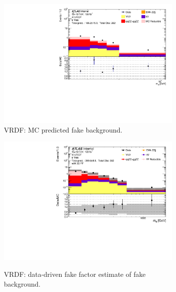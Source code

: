 \begin{figure}[htb]
    \centering
    \begin{subfigure}{.48\textwidth}
        \centering
        \includegraphics[width = 0.9\linewidth]{figures/Analysis/Background/Overlay_VRDF_MC_M4l.pdf}
        \caption{VRDF: MC predicted fake background.\label{subfig:VRDFMCRed}}
    \end{subfigure}
    \begin{subfigure}{.48\textwidth}
        \centering
        \includegraphics[width = 0.9\linewidth]{figures/Analysis/Background/Overlay_VRDF_FFApplied_M4l.pdf}\\
        \caption{ VRDF: data-driven fake factor estimate of fake background. \label{subfig:VRDFFF} }
    \end{subfigure}
    \begin{subfigure}{.48\textwidth}
        \centering

\end{subfigure}
\end{figure}
